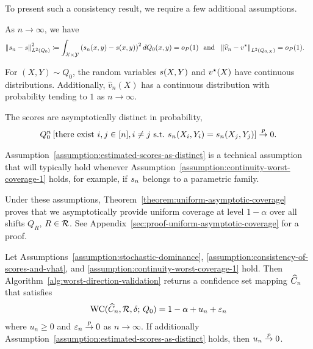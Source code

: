 To present such a consistency result, we require a few additional
assumptions.
\begin{assumption}
  \label{assumption:consistency-of-scores-and-vhat}
  As $n \to \infty$, we have
  \begin{align*}
    \left\|{s_n - s}\right\|_{L^2(Q_0)}^2
    &\coloneqq \int_{\mathcal{X} \times \mathcal{Y}} \left(s_n(x,y) - s(x,y) \right)^2
    dQ_0(x,y)  = o_{P}(1)
    ~~\text{and} ~~
    \left\|{\widehat{v}_n-v^*}\right\|_{L^2(Q_{0,X})}  = o_{P}(1).
  \end{align*}
\end{assumption}

\begin{assumption}
  \label{assumption:continuity-worst-coverage-1}
  For $(X,Y) \sim Q_0$, the random variables
  $s(X,Y)$ and $v^\star(X)$ have continuous
  distributions. 
  Additionally,  $\hat v_n(X)$ has a continuous distribution with probability tending to $1$ as $n \to \infty$.
\end{assumption}

\begin{assumption}
  \label{assumption:estimated-scores-as-distinct}
  The scores are asymptotically distinct in probability,
  \begin{align*}
    Q_{0}^n \left[ \mbox{there~exist} ~ i,j \in [n], i \neq j ~ \mbox{s.t.}
      ~ s_n(X_i,Y_i) = s_n(X_j,Y_j) \right] \stackrel{p}{\rightarrow} 0.
  \end{align*}
\end{assumption}
\noindent
Assumption~\ref{assumption:estimated-scores-as-distinct} is a technical
assumption that will typically hold whenever
Assumption~\ref{assumption:continuity-worst-coverage-1} holds, for example,
if $s_n$ belongs to a parametric family.

Under these assumptions, Theorem~\ref{theorem:uniform-asymptotic-coverage}
proves that we asymptotically provide uniform coverage at level $1-\alpha$
over all shifts $Q_R$, $R \in \mathcal{R}$.  See
Appendix~\ref{sec:proof-uniform-asymptotic-coverage} for a proof.

\begin{theorem}
  \label{theorem:uniform-asymptotic-coverage}
  Let Assumptions~\ref{assumption:stochastic-dominance},
  \ref{assumption:consistency-of-scores-and-vhat},
  and
  \ref{assumption:continuity-worst-coverage-1} hold.  Then
  Algorithm~\ref{alg:worst-direction-validation}
  returns a confidence set mapping $\widehat{C}_n$ that satisfies
  \begin{align*}
    \textup{WC}( \widehat{C}_n, \mathcal{R}, \delta; \,  Q_{0}) = 1 - \alpha + u_n +
    \varepsilon_n
  \end{align*}
  where $u_n \ge 0$ and $\varepsilon_n \stackrel{p}{\rightarrow} 0$ as $n \to \infty$.
  If additionally Assumption~\ref{assumption:estimated-scores-as-distinct}
  holds, then $u_n \stackrel{p}{\rightarrow} 0$.
\end{theorem}

